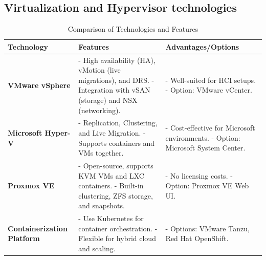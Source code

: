 \documentclass{llncs}
\begin{document}
\subsection{Virtualization and Hypervisor technologies}
\begin{table}[H]
  \setlength{\tabcolsep}{5pt} %
  \renewcommand{\arraystretch}{1.2} %
  \centering
  \begin{tabular}{|p{3.5cm}|p{7cm}|p{4.5cm}|}
  \hline
  \textbf{Technology} & \textbf{Features} & \textbf{Advantages/Options} \\
  \hline
  
  \textbf{VMware vSphere} & 
  - High availability (HA), vMotion (live migrations), and DRS. \newline 
  - Integration with vSAN (storage) and NSX (networking). & 
  - Well-suited for HCI setups. \newline 
  - Option: VMware vCenter. \\
  \hline
  
  \textbf{Microsoft Hyper-V} & 
  - Replication, Clustering, and Live Migration. \newline 
  - Supports containers and VMs together. & 
  - Cost-effective for Microsoft environments. \newline 
  - Option: Microsoft System Center. \\
  \hline

  \textbf{Proxmox VE} & 
  - Open-source, supports KVM VMs and LXC containers. \newline 
  - Built-in clustering, ZFS storage, and snapshots. & 
  - No licensing costs. \newline 
  - Option: Proxmox VE Web UI. \\
  \hline
  
  \textbf{Containerization Platform} & 
  - Use Kubernetes for container orchestration. \newline 
  - Flexible for hybrid cloud and scaling. & 
  - Options: VMware Tanzu, Red Hat OpenShift. \\
  \hline
  
  \end{tabular}
  \caption{Comparison of Technologies and Features}
  \label{tab:technologies}
\end{table}
  
\end{document}
